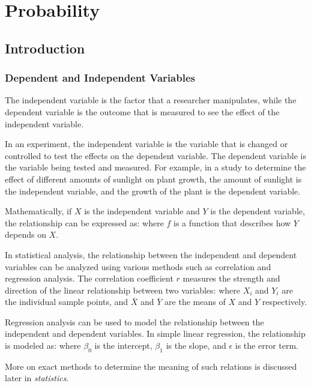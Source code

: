 \chapter{Probability}\label{Probability}

\section{Introduction}\label{Introduction}

\subsection{Dependent and Independent Variables}\label{Dependent and Independent Variables}
The independent variable is the factor that a researcher manipulates, while the dependent variable is the outcome that is measured to see the effect of the independent variable.

In an experiment, the independent variable is the variable that is changed or controlled to test the effects on the dependent variable. The dependent variable is the variable being tested and measured. For example, in a study to determine the effect of different amounts of sunlight on plant growth, the amount of sunlight is the independent variable, and the growth of the plant is the dependent variable.

Mathematically, if $X$ is the independent variable and $Y$ is the dependent variable, the relationship can be expressed as:
where $f$ is a function that describes how $Y$ depends on $X$.

In statistical analysis, the relationship between the independent and dependent variables can be analyzed using various methods such as correlation and regression analysis. The correlation coefficient $r$ measures the strength and direction of the linear relationship between two variables:
where $X_i$ and $Y_i$ are the individual sample points, and $\bar{X}$ and $\bar{Y}$ are the means of $X$ and $Y$ respectively.

Regression analysis can be used to model the relationship between the independent and dependent variables. In simple linear regression, the relationship is modeled as:
where $\beta_0$ is the intercept, $\beta_1$ is the slope, and $\epsilon$ is the error term.

More on exact methods to determine the meaning of such relations is discussed later in \textit{statistics}.

